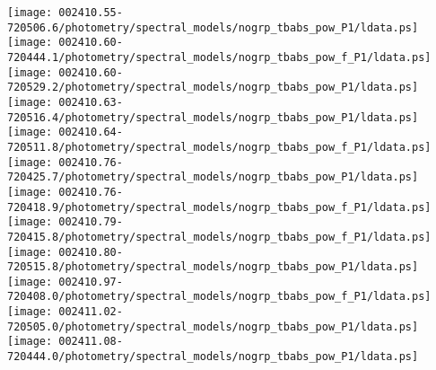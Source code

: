 \documentclass{aastex}
\begin{document}
\begin{figure*}[!ht]
\centering
\texttt{[image: 002410.55-720506.6/photometry/spectral\_models/nogrp\_tbabs\_pow\_P1/ldata.ps]} \hfill 
\texttt{[image: 002410.60-720444.1/photometry/spectral\_models/nogrp\_tbabs\_pow\_f\_P1/ldata.ps]} \hfill 
\texttt{[image: 002410.60-720529.2/photometry/spectral\_models/nogrp\_tbabs\_pow\_P1/ldata.ps]} \\ 
\vspace*{0.5in}
\texttt{[image: 002410.63-720516.4/photometry/spectral\_models/nogrp\_tbabs\_pow\_P1/ldata.ps]} \hfill 
\texttt{[image: 002410.64-720511.8/photometry/spectral\_models/nogrp\_tbabs\_pow\_f\_P1/ldata.ps]} \hfill 
\texttt{[image: 002410.76-720425.7/photometry/spectral\_models/nogrp\_tbabs\_pow\_P1/ldata.ps]} \\ 
\vspace*{0.5in}
\texttt{[image: 002410.76-720418.9/photometry/spectral\_models/nogrp\_tbabs\_pow\_f\_P1/ldata.ps]} \hfill 
\texttt{[image: 002410.79-720415.8/photometry/spectral\_models/nogrp\_tbabs\_pow\_f\_P1/ldata.ps]} \hfill 
\texttt{[image: 002410.80-720515.8/photometry/spectral\_models/nogrp\_tbabs\_pow\_P1/ldata.ps]} \\ 
\vspace*{0.5in}
\texttt{[image: 002410.97-720408.0/photometry/spectral\_models/nogrp\_tbabs\_pow\_f\_P1/ldata.ps]} \hfill 
\texttt{[image: 002411.02-720505.0/photometry/spectral\_models/nogrp\_tbabs\_pow\_P1/ldata.ps]} \hfill 
\texttt{[image: 002411.08-720444.0/photometry/spectral\_models/nogrp\_tbabs\_pow\_P1/ldata.ps]} \\ 
\vspace*{0.5in}
\end{figure*}
\clearpage
\end{document}

